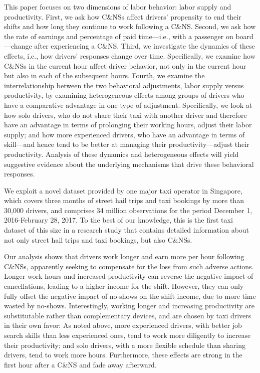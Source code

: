 \documentclass[reviewmode]{restud}
\begin{document}
This paper focuses on two dimensions of labor behavior: labor supply and productivity. First, we ask how C\&NSs affect drivers' propensity to end their shifts and how long they continue to work following a C\&NS.  Second, we ask how the rate of earnings and percentage of paid time---i.e., with a passenger on board---change after experiencing a C\&NS. Third, we investigate the dynamics of these effects, i.e., how drivers' responses change over time. Specifically, we examine how C\&NSs in the current hour affect driver behavior, not only in the current hour but also in  each of the subsequent hours. Fourth, we examine the interrelationship between the two behavioral adjustments, labor supply versus productivity, by examining heterogeneous effects among groups of drivers who have a comparative advantage in one type of adjustment. Specifically, we look at how solo drivers, who do not share their taxi with another driver and therefore have an advantage in terms of prolonging their working hours, adjust their labor supply; and how more experienced drivers, who have an advantage in terms of skill---and hence tend to be better at managing their productivity---adjust their  productivity. Analysis of these dynamics and heterogeneous effects will yield suggestive evidence about the underlying mechanisms that drive these behavioral responses.

We exploit a novel dataset provided by one major taxi operator in Singapore, which covers three months of street hail trips and taxi bookings by more than 30,000 drivers, and comprises 34 million observations for the period December 1, 2016-February 28, 2017. To the best of our knowledge, this is the first taxi dataset of this size in a research study that contains detailed information about not only street hail trips and taxi bookings, but also C\&NSs.

Our analysis shows that drivers work longer and earn more per hour following C\&NSs, apparently seeking to compensate for the loss from such adverse actions. Longer work hours and increased productivity can reverse the negative impact of cancellations, leading to a higher income for the shift. However, they can only fully offset the negative impact of no-shows on the shift income, due to more time wasted by no-shows. Interestingly, working longer and increasing productivity are substitutable rather than complementary devices, and are chosen by taxi drivers in their own favor: As noted above, more experienced drivers, with better job search skills than less experienced ones, tend to work more diligently to increase their productivity; and solo drivers, with a more flexible schedule than sharing drivers, tend to work more hours. Furthermore, these effects are strong in the first hour after a C\&NS and fade away afterward.
\end{document}
